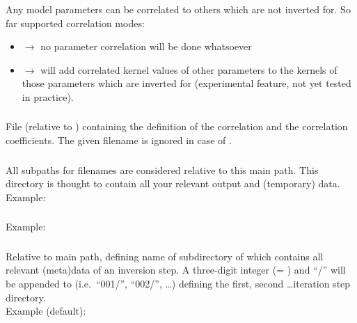 \subsubsection{} \label{files,sec:main_parfile,itm:par_cor_mode}
Any model parameters can be correlated to others which are not inverted for. So far supported correlation modes:
\begin{itemize}
\item[]  $\rightarrow$ no parameter correlation will be done whatsoever
\item[]  $\rightarrow$ will add correlated kernel values of other parameters to the kernels
  of those parameters which are inverted for (experimental feature, not yet tested in practice).
\end{itemize}
\subsubsection{} \label{files,sec:main_parfile,itm:par_cor_file}
File (relative to ) containing the definition of the correlation and the correlation coefficients. 
The given filename is ignored in case of .
\subsubsection{} \label{files,sec:main_parfile,itm:main_path}
All subpaths for filenames are considered relative to this main path. This
directory is thought to contain all your relevant output and (temporary) data.\\
Example: 
\subsubsection{} \label{files,sec:main_parfile,itm:cur_iter_step}
Example: 
\subsubsection{} \label{files,sec:main_parfile,itm:iter_path}
Relative to main path, defining name of subdirectory of  which contains 
all relevant (meta)data of an inversion step. A three-digit integer (= ) 
and ``/'' will be appended to  (i.e.\ ``001/'', ``002/'', \dots) defining the 
first, second \dots iteration step directory.\\
Example (default): 
